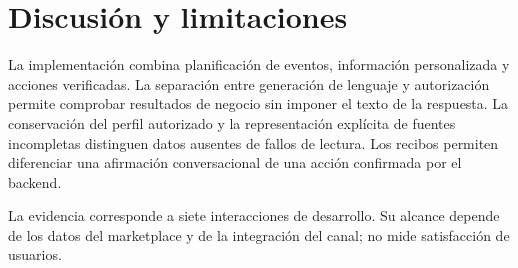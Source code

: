 \documentclass[
	a4paper,
	12pt,
]{CSSullivanBusinessReport}
\begin{document}
\section{Discusión y limitaciones}
La implementación combina planificación de eventos, información personalizada y acciones verificadas. La separación entre generación de lenguaje y autorización permite comprobar resultados de negocio sin imponer el texto de la respuesta. La conservación del perfil autorizado y la representación explícita de fuentes incompletas distinguen datos ausentes de fallos de lectura. Los recibos permiten diferenciar una afirmación conversacional de una acción confirmada por el backend.

La evidencia corresponde a siete interacciones de desarrollo. Su alcance depende de los datos del marketplace y de la integración del canal; no mide satisfacción de usuarios.

\newpage
\printbibliography[title={Referencias}]
\end{document}
